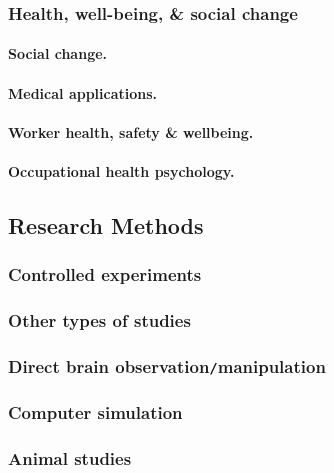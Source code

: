 \documentclass[oneside]{book}
\numberwithin{equation}{section}
\begin{document}
\subsubsection{Health, well-being, \& social change}

\paragraph{Social change.}

\paragraph{Medical applications.}

\paragraph{Worker health, safety \& wellbeing.}

\paragraph{Occupational health psychology.}

\subsection{Research Methods}

\subsubsection{Controlled experiments}

\subsubsection{Other types of studies}

\subsubsection{Direct brain observation\texttt{/}manipulation}

\subsubsection{Computer simulation}

\subsubsection{Animal studies}
\end{document}
